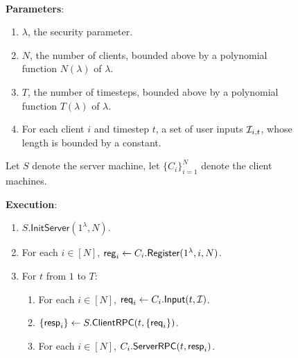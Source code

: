 \begin{figure}[h!]
\begin{framed}
\begin{definition}  \hfill\\
\label{defn:honest-server-experiment}
\textbf{Parameters}: \begin{enumerate}
    \item $\lambda$, the security parameter.
    \item $N$, the number of clients, bounded above by a polynomial function $N(\lambda)$ of $\lambda$.
    \item $T$, the number of timesteps, bounded above by a polynomial function $T(\lambda)$ of $\lambda$.
    \item For each client $i$ and timestep $t$, a set of user inputs $\mathcal{I}_{i, t}$, whose length is bounded by a constant.
\end{enumerate}

Let $S$ denote the server machine, let $\{C_i\}_{i = 1}^N$ denote the client machines.

\textbf{Execution}:
\begin{enumerate}
\item $S.\mathsf{InitServer}(1^{\lambda}, N)$. 
\item For each $i \in [N]$, $\mathsf{reg}_i \leftarrow C_i.\mathsf{Register}(1^{\lambda}, i, N)$. 
\item For $t$ from $1$ to $T$:
    \begin{enumerate}
    \item For each $i \in [N]$, $\mathsf{req}_i \leftarrow C_i.\mathsf{Input}(t, \mathcal{I})$.
    
    \item $\{\mathsf{resp}_i\} \leftarrow S.\mathsf{ClientRPC}(t, \{\mathsf{req}_i\})$.
    
    \item For each $i \in [N]$, $C_i.\mathsf{ServerRPC}(t, \mathsf{resp}_i)$.
    \end{enumerate}
\end{enumerate}
\end{definition}
\end{framed}
\end{figure}


